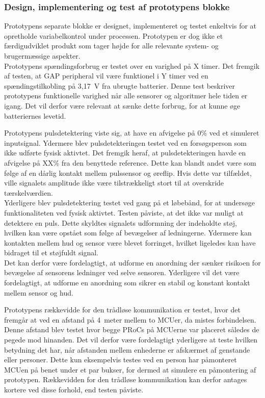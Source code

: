 \subsubsection{Design, implementering og test af prototypens blokke}
Prototypens separate blokke er designet, implementeret og testet enkeltvis for at opretholde variabelkontrol under processen. Prototypen er dog ikke et færdigudviklet produkt som tager højde for alle relevante system- og brugermæssige aspekter. \\
Prototypens spændingsforbrug er testet over en varighed på X timer. Det fremgik af testen, at GAP peripheral vil være funktionel i Y timer ved en spændingstilkobling på 3,17~V fra ubrugte batterier. Denne test beskriver prototypens funktionelle varighed når alle sensorer og algoritmer hele tiden er igang. Det vil derfor være relevant at sænke dette forbrug, for at kunne øge batteriernes levetid.

Prototypens pulsdetektering viste sig, at have en afvigelse på 0\% ved et simuleret inputsignal. Ydermere blev pulsdetekteringen testet ved en forsøgsperson som ikke udførte fysisk aktivtet. Det fremgik heraf, at pulsdetekteringen havde en afvigelse på XX\% fra den benyttede reference. Dette kan blandt andet være som følge af en dårlig kontakt mellem pulssensor og øreflip. Hvis dette var tilfældet, ville signalets amplitude ikke være tilstrækkeligt stort til at overskride tærskelværdien. \\
Yderligere blev pulsdetektering testet ved gang på et løbebånd, for at undersøge funktionaliteten ved fysisk aktivtet. Testen påviste, at det ikke var muligt at detektere en puls. Dette skyldtes signalets udformning der indeholdte støj, hvilken kan være opstået som følge af bevægelser af ledningerne. Ydermere kan kontakten mellem hud og sensor være blevet forringet, hvilket ligeledes kan have bidraget til et støjfuldt signal. \\
Det kan derfor være fordelagtigt, at udforme en anordning der sænker risikoen for bevægelse af sensorens ledninger ved selve sensoren. Yderligere vil det være fordelagtigt, at udforme en anordning som sikrer en stabil og konstant kontakt mellem sensor og hud.

Prototypens rækkevidde for den trådløse kommunikation er testet, hvor det fremgår at ved en afstand på 4~meter mellem to MCUer, da mistes forbindelsen. Denne afstand blev testet hvor begge PRoCs på MCUerne var placeret således de pegede mod hinanden. Det vil derfor være fordelagtigt yderligere at teste hvilken betydning det har, når afstanden mellem enhederne er afskærmet af genstande eller personer. Dette kun eksempelvis testes ved en person har påmonteret MCUen på benet under et par bukser, for dermed at simulere en påmontering af prototypen. Rækkevidden for den trådløse kommunikation kan derfor antages kortere ved disse forhold, end testen påviste.


